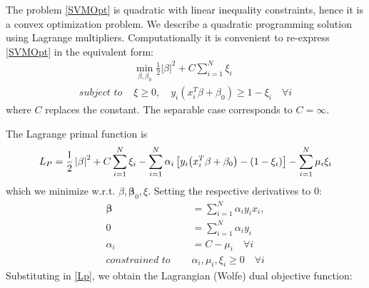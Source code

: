 \documentclass[12pt, letterpaper]{article}
\theoremstyle{definition}
\newcommand{\be}{\mathbf{\beta}}
\DeclarePairedDelimiter\autobracket{(}{)}
\newcommand{\br}[1]{\autobracket*{#1}}
\begin{document}
The problem \ref{SVMOpt} is quadratic with linear inequality constraints, hence it is a convex optimization problem. We describe a quadratic programming solution using Lagrange multipliers. Computationally it is convenient to re-express \ref{SVMOpt} in the equivalent form:
\begin{equation}
\begin{aligned}
&\min_{\beta, \beta_0} \frac{1}{2}\left|\beta\right|^2 + C\sum_{i=1}^N \xi_i\\
\textit{subject to } &\xi \ge 0, \quad y_i(x_i^T\beta+\beta_0)\ge 1-\xi_i \quad\forall i
\end{aligned}
\end{equation}
where $C$ replaces the constant. The separable case corresponds to $C = \infty$.

The Lagrange primal function is 
\begin{equation}
L_P = \frac{1}{2}\left| \beta\right|^2 + C \sum_{i=1}^N \xi_i - \sum_{i=1}^N \alpha_i \left[y_i\br{x_i^T\beta+\beta_0}-\br{1-\xi_i}\right] - \sum_{i=1}^N \mu_i \xi_i 
\label{Lp}
\end{equation}
which we minimize w.r.t. $\beta, \be_0, \xi$. Setting the respective derivatives to $0$:
\begin{equation}
\begin{aligned}
\be &= \sum_{i=1}^N  \alpha_i y_i x_i,\\
0 &= \sum_{i=1}^N \alpha_i y_i\\
\alpha_i &= C - \mu_i \quad \forall i\\
\textit{constrained to } \quad  &\alpha_i,\mu_i, \xi_i \ge 0 \quad \forall i
\end{aligned}
\end{equation}
Substituting in \ref{Lp}, we obtain the Lagrangian (Wolfe) dual objective function:
\end{document}
